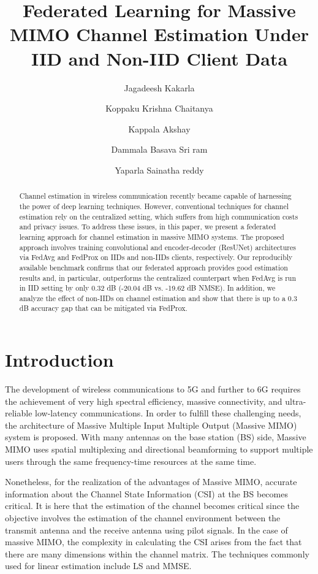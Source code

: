 \documentclass{llncs}
\title{Federated Learning for Massive MIMO Channel Estimation Under IID and Non-IID Client Data}
\author{Jagadeesh Kakarla \and Koppaku Krishna Chaitanya \and Kappala Akshay \and Dammala Basava Sri ram \and Yaparla Sainatha reddy}
\institute{Indian Institute of Information Technology, Design and Manufacturing, Kancheepuram\\
\email{jagadeeshk@iiitdm.ac.in, krish23306@gmail.com, dammala.sriram9@gmail.com, akshaykappala1029@gmail.com, sainathreddy057@gmail.com}}
\begin{document}
\maketitle

\begin{abstract}
Channel estimation in wireless communication recently became capable of harnessing the power of deep learning techniques. However, conventional techniques for channel estimation rely on the centralized setting, which suffers from high
communication costs and privacy issues. To address these issues, in this paper, we present a federated learning approach
for channel estimation in massive MIMO systems. The proposed
approach involves training convolutional and encoder-decoder
(ResUNet) architectures via FedAvg and FedProx on IIDs and
non-IIDs clients, respectively. Our reproducibly available benchmark confirms that our federated approach provides good estimation results and, in particular, outperforms the centralized counterpart when FedAvg is run in IID setting by only 0.32 dB (-20.04 dB vs. -19.62 dB NMSE). In addition, we analyze the effect of non-IIDs on channel estimation and show that there is up to a 0.3 dB accuracy gap that can be mitigated via FedProx.
\end{abstract}

\section{Introduction}
The development of wireless communications to 5G and further to 6G requires the achievement of very high spectral efficiency, massive connectivity, and ultra-reliable low-latency communications. In order to fulfill these challenging needs, the
architecture of Massive Multiple Input Multiple Output (Massive MIMO) system is proposed. With many antennas on the base station (BS) side, Massive MIMO uses spatial multiplexing and directional beamforming to support multiple users through the same frequency-time resources at the same time.

Nonetheless, for the realization of the advantages of Massive MIMO, accurate information about the Channel State Information (CSI) at the BS becomes critical. It is here that the estimation of the channel becomes critical since the objective involves the estimation of the channel environment between the transmit antenna and the receive antenna using pilot signals. In the case of massive MIMO, the complexity in calculating the CSI arises from the fact that there are many dimensions within the channel matrix. The techniques commonly used for linear estimation include LS and MMSE.
\end{document}
